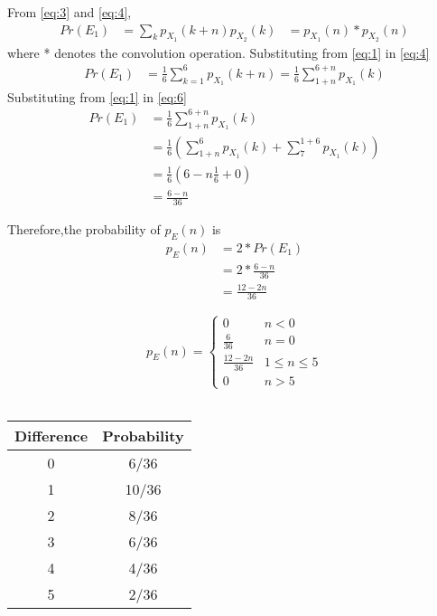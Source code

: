 \documentclass[journal,12pt,twocolumn]{IEEEtran}
\begin{document}
From \eqref{eq:3} and \eqref{eq:4},
\begin{align}
  Pr(E_1) &=\sum_{k}p_{X_{1}}(k+n)p_{X_{2}}(k)
  &= p_{X_{1}}(n)*p_{X_{2}}(n)\label{eq:5}
\end{align}
where * denotes the convolution operation. Substituting from \eqref{eq:1} in \eqref{eq:4}
\begin{align}
  Pr(E_1) &=\frac{1}{6}\sum_{k=1}^{6}p_{X_{1}}(k+n)=\frac{1}{6}\sum_{1+n}^{6+n}p_{X_{1}}(k)\label{eq:6}
\end{align}
Substituting from \eqref{eq:1} in \eqref{eq:6}
\begin{align}
  Pr(E_1) &=\frac{1}{6}\sum_{1+n}^{6+n}p_{X_{1}}(k)\nonumber\\
  &=\frac{1}{6}(\sum_{1+n}^{6}p_{X_{1}}(k)+\sum_{7}^{1+6}p_{X_{1}}(k))\nonumber\\
   &=\frac{1}{6}(6-n\frac{1}{6}+0)\nonumber\\
    &=\frac{6-n}{36}\nonumber
\end{align} 

Therefore,the probability of $p_E(n)$ is
\begin{align}
	p_E(n)&=2*Pr(E_1)\nonumber\\
	&=2*\frac{6-n}{36}\nonumber\\
	&=\frac{12-2n}{36}\nonumber
\end{align} 



\begin{equation}
p_{E}(n) =  
\begin{cases}
    0 &  n <  0  \\
    \frac{6}{36} & n=0\\
    \frac{12-2n}{36}& 1\leq  n\leq 5\\
    0 &  n>5
\end{cases}
\label{eq:pmf}
\end{equation}\\
\begin{center}
  \begin{tabular}{| c | c |}
    \hline
    Difference & Probability \\ \hline
    0 & 6/36\\
    1 & 10/36 \\ 
    2 & 8/36 \\ 
    3 & 6/36 \\ 
    4 & 4/36 \\ 
    5 & 2/36 \\  
    \hline
  \end{tabular}
\end{center}
\end{document}
